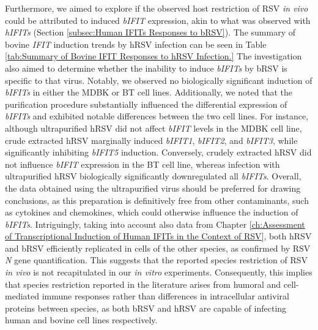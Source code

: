 Furthermore, we aimed to explore if the observed host restriction of RSV \textit{in vivo} could be attributed to induced \textit{bIFIT} expression, akin to what was observed with \textit{hIFITs} (Section \ref{subsec:Human IFITs Responses to bRSV}). The summary of bovine \textit{IFIT} induction trends by hRSV infection can be seen in Table \ref{tab:Summary of Bovine IFIT Responses to hRSV Infection.} The investigation also aimed to determine whether the inability to induce \textit{bIFITs} by bRSV is specific to that virus. Notably, we observed no biologically significant induction of \textit{bIFITs} in either the MDBK or BT cell lines. Additionally, we noted that the purification procedure substantially influenced the differential expression of \textit{bIFITs} and exhibited notable differences between the two cell lines. For instance, although ultrapurified hRSV did not affect \textit{bIFIT} levels in the MDBK cell line, crude extracted hRSV marginally induced \textit{bIFIT1}, \textit{bIFIT2}, and \textit{bIFIT3}, while significantly inhibiting \textit{bIFIT5} induction. Conversely, crudely extracted hRSV did not influence \textit{bIFIT} expression in the BT cell line, whereas infection with ultrapurified hRSV biologically significantly downregulated all \textit{bIFITs}. Overall, the data obtained using the ultrapurified virus should be preferred for drawing conclusions, as this preparation is definitively free from other contaminants, such as cytokines and chemokines, which could otherwise influence the induction of \textit{bIFITs}. Intriguingly, taking into account also data from Chapter \ref{ch:Assessment of Transcriptional Induction of Human IFITs in the Context of RSV}, both hRSV and bRSV efficiently replicated in cells of the other species, as confirmed by RSV \textit{N} gene quantification. This suggests that the reported species restriction of RSV \textit{in vivo} is not recapitulated in our \textit{in vitro} experiments. Consequently, this implies that species restriction reported in the literature arises from humoral and cell-mediated immune responses rather than differences in intracellular antiviral proteins between species, as both bRSV and hRSV are capable of infecting human and bovine cell lines respectively.

